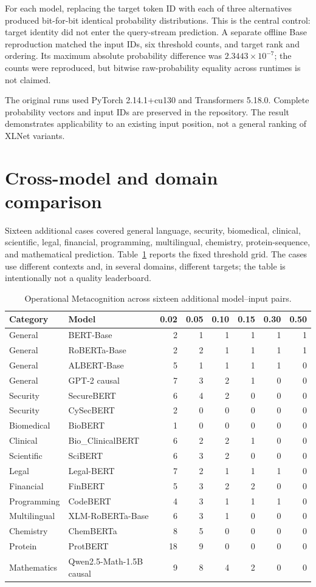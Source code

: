 For each model, replacing the target token ID with each of three alternatives produced bit-for-bit identical probability distributions. This is the central control: target identity did not enter the query-stream prediction. A separate offline Base reproduction matched the input IDs, six threshold counts, and target rank and ordering. Its maximum absolute probability difference was $2.3443\times10^{-7}$; the counts were reproduced, but bitwise raw-probability equality across runtimes is not claimed.

The original runs used PyTorch 2.14.1+cu130 and Transformers 5.18.0. Complete probability vectors and input IDs are preserved in the repository. The result demonstrates applicability to an existing input position, not a general ranking of XLNet variants.

\section{Cross-model and domain comparison}
Sixteen additional cases covered general language, security, biomedical, clinical, scientific, legal, financial, programming, multilingual, chemistry, protein-sequence, and mathematical prediction. Table~\ref{tab:model-comparison} reports the fixed threshold grid. The cases use different contexts and, in several domains, different targets; the table is intentionally not a quality leaderboard.
\begin{table}[htbp]
\centering
\caption{Operational Metacognition across sixteen additional model--input pairs.}
\label{tab:model-comparison}
{\scriptsize
\setlength{\tabcolsep}{3.5pt}
\begin{tabular}{llrrrrrr}
\toprule
Category&Model&0.02&0.05&0.10&0.15&0.30&0.50\\
\midrule
General&BERT-Base&2&1&1&1&1&1\\
General&RoBERTa-Base&2&2&1&1&1&1\\
General&ALBERT-Base&5&1&1&1&1&0\\
General&GPT-2 causal&7&3&2&1&0&0\\
Security&SecureBERT&6&4&2&0&0&0\\
Security&CySecBERT&2&0&0&0&0&0\\
Biomedical&BioBERT&1&0&0&0&0&0\\
Clinical&Bio\_ClinicalBERT&6&2&2&1&0&0\\
Scientific&SciBERT&6&3&2&0&0&0\\
Legal&Legal-BERT&7&2&1&1&1&0\\
Financial&FinBERT&5&3&2&2&0&0\\
Programming&CodeBERT&4&3&1&1&1&0\\
Multilingual&XLM-RoBERTa-Base&6&3&1&0&0&0\\
Chemistry&ChemBERTa&8&5&0&0&0&0\\
Protein&ProtBERT&18&9&0&0&0&0\\
Mathematics&Qwen2.5-Math-1.5B causal&9&8&4&2&0&0\\
\bottomrule
\end{tabular}}
\end{table}

